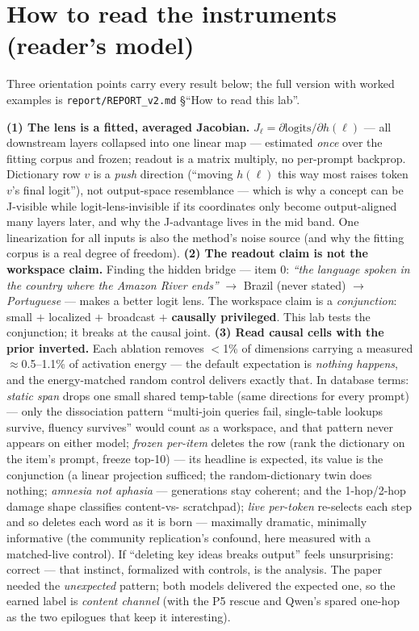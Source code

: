 \documentclass[10pt]{article}
\newcommand{\code}[1]{\texttt{#1}}
\begin{document}
\section{How to read the instruments (reader's model)}

Three orientation points carry every result below; the full version with
worked examples is \code{report/REPORT\_v2.md} \S``How to read this lab''.

\textbf{(1) The lens is a fitted, averaged Jacobian.} $J_\ell = \partial
\text{logits}/\partial h(\ell)$ --- all downstream layers collapsed into
one linear map --- estimated \emph{once} over the fitting corpus and
frozen; readout is a matrix multiply, no per-prompt backprop. Dictionary
row $v$ is a \emph{push} direction (``moving $h(\ell)$ this way most
raises token $v$'s final logit''), not output-space resemblance --- which
is why a concept can be J-visible while logit-lens-invisible if its
coordinates only become output-aligned many layers later, and why the
J-advantage lives in the mid band. One linearization for all inputs is
also the method's noise source (and why the fitting corpus is a real
degree of freedom). \textbf{(2) The readout claim is not the workspace
claim.} Finding the hidden bridge --- item 0: \emph{``the language spoken
in the country where the Amazon River ends''} $\to$ Brazil (never
stated) $\to$ \emph{Portuguese} --- makes a better logit lens. The
workspace claim is a \emph{conjunction}: small $+$ localized $+$
broadcast $+$ \textbf{causally privileged}. This lab tests the
conjunction; it breaks at the causal joint. \textbf{(3) Read causal
cells with the prior inverted.} Each ablation removes $<$1\% of
dimensions carrying a measured $\approx$0.5--1.1\% of activation energy
--- the default expectation is \emph{nothing happens}, and the
energy-matched random control delivers exactly that. In database terms:
\emph{static span} drops one small shared temp-table (same directions
for every prompt) --- only the dissociation pattern ``multi-join queries
fail, single-table lookups survive, fluency survives'' would count as a
workspace, and that pattern never appears on either model;
\emph{frozen per-item} deletes the row (rank the dictionary on the
item's prompt, freeze top-10) --- its headline is expected, its value is
the conjunction (a linear projection sufficed; the random-dictionary
twin does nothing; \emph{amnesia not aphasia} --- generations stay
coherent; and the 1-hop/2-hop damage shape classifies content-vs-
scratchpad); \emph{live per-token} re-selects each step and so deletes
each word as it is born --- maximally dramatic, minimally informative
(the community replication's confound, here measured with a matched-live
control). If ``deleting key ideas breaks output'' feels unsurprising:
correct --- that instinct, formalized with controls, is the analysis.
The paper needed the \emph{unexpected} pattern; both models delivered
the expected one, so the earned label is \emph{content channel} (with
the P5 rescue and Qwen's spared one-hop as the two epilogues that keep
it interesting).
\end{document}
